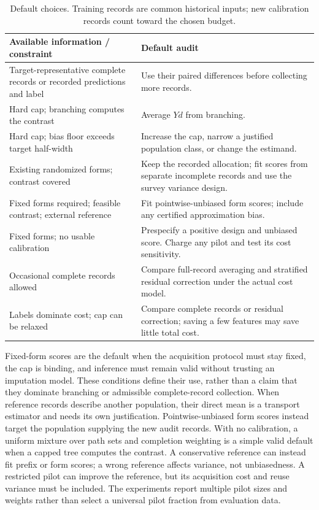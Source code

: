 \begin{table}[t]
\centering
\caption{Default choices. Training records are common historical inputs;
new calibration records count toward the chosen budget.}
\label{tab:decision}
\small
\setlength{\tabcolsep}{3pt}
\begin{tabular}{p{}p{}}
\toprule
Available information / constraint & Default audit \\
\midrule
Target-representative complete records or recorded predictions and label & Use their paired differences before collecting more records. \\
Hard cap; branching computes the contrast & Average $Yd$ from branching. \\
Hard cap; bias floor exceeds target half-width & Increase the cap, narrow a justified population class, or change the estimand. \\
Existing randomized forms; contrast covered & Keep the recorded allocation; fit scores from separate incomplete records and use the survey variance design. \\
Fixed forms required; feasible contrast; external reference & Fit pointwise-unbiased form scores; include any certified approximation bias. \\
Fixed forms; no usable calibration & Prespecify a positive design and unbiased score. Charge any pilot and test its cost sensitivity. \\
Occasional complete records allowed & Compare full-record averaging and stratified residual correction under the actual cost model. \\
Labels dominate cost; cap can be relaxed & Compare complete records or residual correction; saving a few features may save little total cost. \\
\bottomrule
\end{tabular}
\end{table}

Fixed-form scores are the default when the acquisition protocol must stay
fixed, the cap is binding, and inference must remain valid without trusting
an imputation model. These conditions define their use, rather than a claim
that they dominate branching or admissible complete-record collection.
When reference records describe another population, their direct mean is a
transport estimator and needs its own justification. Pointwise-unbiased form
scores instead target the population supplying the new audit records.
With no calibration, a uniform mixture over path sets and completion
weighting is a simple valid default when a capped tree computes the contrast.
A conservative reference can instead fit prefix or form scores; a wrong
reference affects variance, not unbiasedness. A restricted pilot can improve
the reference, but its acquisition cost and reuse variance must be included.
The experiments report multiple pilot sizes and weights rather than select
a universal pilot fraction from evaluation data.

